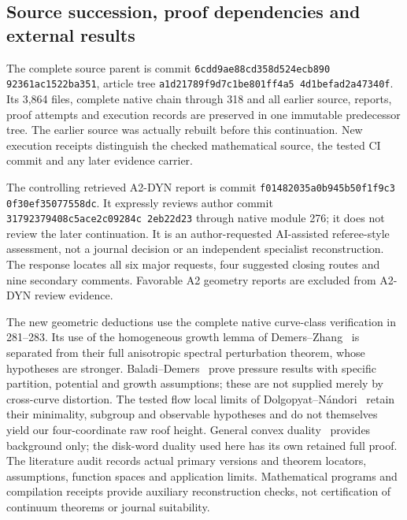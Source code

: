 \documentclass[11pt,reqno]{amsart}
\numberwithin{equation}{section}
\theoremstyle{definition}\newtheorem{definition}[theorem]{Definition}
\theoremstyle{remark}\newtheorem{remark}[theorem]{Remark}
\begin{document}
\subsection*{Source succession, proof dependencies and external results}
The complete source parent is commit
\texttt{6cdd9ae8\allowbreak 8cd358d5\allowbreak 24ecb890\allowbreak
92361ac1\allowbreak 522ba351}, article tree
\texttt{a1d21789\allowbreak f9d7c1be\allowbreak801ff4a5\allowbreak
4d1befad\allowbreak2a47340f}.
Its 3,864 files, complete native chain through 318 and all earlier
source, reports, proof attempts and execution records are preserved
in one immutable predecessor tree. The earlier source was actually
rebuilt before this continuation. New execution receipts distinguish
the checked mathematical source, the tested CI commit and any later
evidence carrier.

The controlling retrieved A2-DYN report is commit
\texttt{f0148203\allowbreak5a0b945b\allowbreak50f1f9c3\allowbreak
0f30ef35\allowbreak077558dc}.
It expressly reviews author commit
\texttt{31792379\allowbreak408c5ace\allowbreak2c09284c\allowbreak
2eb22d23}
through native module 276; it does not review the later continuation.
It is an author-requested AI-assisted referee-style assessment,
not a journal decision or an independent specialist reconstruction.
The response locates all six major requests, four suggested closing
routes and nine secondary comments. Favorable A2 geometry reports
are excluded from A2-DYN review evidence.

The new geometric deductions use the complete native curve-class
verification in 281--283. Its use of the homogeneous growth lemma
of Demers--Zhang~\cite[Lemma 3.2(b), PDF p.~12]{DZUniform} is separated from their full
anisotropic spectral perturbation theorem, whose hypotheses are
stronger. Baladi--Demers~\cite{BDPressure} prove pressure results
with specific partition, potential and growth assumptions; these
are not supplied merely by cross-curve distortion. The tested
flow local limits of Dolgopyat--N\'andori~\cite{DNFlow} retain
their minimality, subgroup and observable hypotheses and do not
themselves yield our four-coordinate raw roof height.
General convex duality~\cite{BVNotes} provides background only;
the disk-word duality used here has its own retained full proof.
The literature audit records actual primary versions and theorem
locators, assumptions, function spaces and application limits.
Mathematical programs and compilation receipts provide auxiliary
reconstruction checks, not certification of continuum theorems
or journal suitability.
\end{document}
